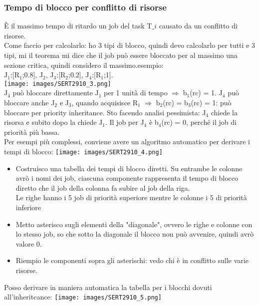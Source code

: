 \documentclass[18px]{article}
\begin{document}
\subsubsection{Tempo di blocco per conflitto di risorse}
È il massimo tempo di ritardo un job del task T$\_{i}$ causato da un conflitto di risorse.\\ Come faccio per calcolarlo: ho 3 tipi di blocco, quindi devo calcolarlo per tutti e 3  tipi, mi il teorema mi dice che il job può essere bloccato per al massimo una sezione critica, quindi considero il massimo.esempio:\\ J$_{1}$:[R$_{1}$;0.8], J$_{2}$, J$_{3}$:[R$_{2}$;0.2], J$_{4}$:[R$_{1}$;1].\\ 
\texttt{[image: images/SERT2910\_3.png]}\\
J$_{4}$ può bloccare direttamente J$_{1}$ per 1 unità di tempo $\Rightarrow$ b$_{1}$(rc) = 1. J$_{4}$ può bloccare anche J$_{2}$ e J$_{3}$, quando acquisisce R$_{1}$ $\Rightarrow$ b$_{2}$(rc) = b$_{3}$(rc) = 1: può bloccare per priority inheritance. Sto facendo analisi pessimista: J$_{4}$ chiede la risorsa e subito dopo la chiede J$_{1}$. Il job per J$_{4}$ è b$_{4}$(rc) = 0, perché il job di priorità più bassa.\\ Per esempi più complessi, conviene avere un algoritmo automatico per derivare i tempi di blocco:
\texttt{[image: images/SERT2910\_4.png]}
\begin{itemize}
\item Costruisco una tabella dei tempi di blocco diretti. Su entrambe le colonne avrò i nomi dei job, ciascuna componente rappresenta il tempo di blocco diretto che il job della colonna fa subire al job della riga.\\ Le righe hanno i 5 job di priorità superiore mentre le colonne i 5 di priorità inferiore
\item Metto asterisco sugli elementi della "diagonale", ovvero le righe e colonne con lo stesso job, so che sotto la diagonale il blocco non può avvenire, quindi avrò valore 0.
\item Riempio le componenti sopra gli asterischi: vedo chi è in conflitto sulle varie risorse.
\end{itemize}
Posso derivare in maniera automatica la tabella per i blocchi dovuti all'inheritcance: 
\texttt{[image: images/SERT2910\_5.png]}
\end{document}
